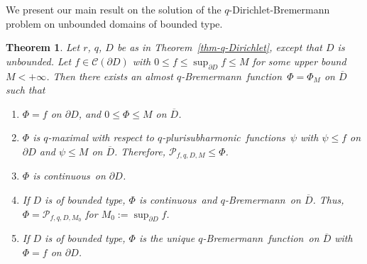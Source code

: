 \documentclass[reqno]{amsart}
\newtheorem{thm}{Theorem}[section]
\theoremstyle{definition}
\numberwithin{equation}{section}
\newcommand{\ccal}{\mathcal{C}}
\newcommand{\pcal}{\mathcal{P}}
\newcommand{\qbrem}{$q$-Bremermann}
\newcommand{\qpsh}{$q$-pluri\-sub\-harmonic}
\newcommand{\cont}{continuous}
\newcommand{\fct}{function}
\newcommand{\fcts}{functions}
\newcommand{\cld}{\overline{D}}
\begin{document}
We present our main result on the solution of the $q$-Dirichlet-Bremermann problem on unbounded domains of bounded type.

\begin{thm}\label{thm-q-Dirichlet-unbounded}
Let $r$, $q$, $D$ be as in Theorem~\ref{thm-q-Dirichlet}, except that $D$ is unbounded. Let $f \in \ccal(\partial D)$ with $0 \leq f \leq \sup_{\partial D} f \leq M$ for some upper bound $M < +\infty$. Then there exists an almost \qbrem\ \fct\ $\Phi=\Phi_M$ on $\cld$ such that

\begin{enumerate}

\item $\Phi=f$ on $\partial D$, and $0 \leq \Phi \leq M$ on $\cld$.

\item $\Phi$ is $q$-maximal with respect to \qpsh\ \fcts\ $\psi$ with $\psi \leq f$ on $\partial D$ and $\psi \leq M$ on $\cld$. Therefore, $\pcal_{f,q,D,M} \leq \Phi$.

\item $\Phi$ is \cont\ on $\partial D$.

\item If $D$ is of bounded type, $\Phi$ is \cont\ and \qbrem\ on $\cld$. Thus, $\Phi=\pcal_{f,q,D,M_0}$ for $M_0:=\sup_{\partial D} f$.

\item If $D$ is of bounded type, $\Phi$ is the unique \qbrem\ \fct\ on $\cld$ with $\Phi=f$ on $\partial D$.%

\end{enumerate}

\end{thm}
\end{document}

